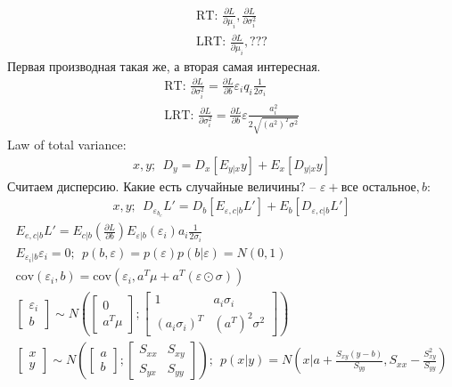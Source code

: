 \documentclass{minimal}
\begin{document}
\begin{gather*}
  \textrm{RT: }\frac{\partial L}{\partial \mu_i}, \frac{\partial L}{\partial \sigma^2_i}\\
  \textrm{LRT: }\frac{\partial L}{\partial \mu_i}, \textrm{???}
\end{gather*}
Первая производная такая же, а вторая самая интересная.
\begin{gather*}
  \textrm{RT: }\frac{\partial L}{\partial \sigma^2_i}=\frac{\partial L}{\partial b}\varepsilon_iq_i\frac{1}{2\sigma_i}\\
  \textrm{LRT: }\frac{\partial L}{\partial \sigma^2_i}=\frac{\partial L}{\partial b}\varepsilon\frac{a_i^2}{2\sqrt{(a^2)^{T}\sigma^2}}
\end{gather*}
Law of total variance:
\begin{gather*}
  x, y;~~ D_y=D_x\left[E_{y|x}y\right]+E_x\left[D_{y|x}y\right]
\end{gather*}
Считаем дисперсию. Какие есть случайные величины? -- $\varepsilon+\textrm{все остальное}, b$:
\begin{gather*}
  x, y;~~ D_{\varepsilon_{b_c}} L'=D_b\left[E_{\varepsilon,c|b}L'\right]+E_b\left[D_{\varepsilon,c|b}L'\right]
\end{gather*}
\begin{gather*}
  E_{e,c|b}L'=E_{c|b}\left(\frac{\partial L}{\partial b}\right)E_{\varepsilon|b}(\varepsilon_i)a_i\frac{1}{2\sigma_i}\\
E_{\varepsilon_i|b}\varepsilon_i=0;~~ p(b,\varepsilon)=p(\varepsilon)p(b|\varepsilon)=N(0,1)\\
  \mathrm{cov}(\varepsilon_i,b)=\mathrm{cov}(\varepsilon_i,a^T\mu+a^T(\varepsilon\odot\sigma))\\
\begin{bmatrix}
  \varepsilon_i\\ b
\end{bmatrix}\sim N\left(
  \begin{bmatrix}
    0\\a^{T}\mu
  \end{bmatrix};
  \begin{bmatrix}
    1&a_i\sigma_i\\
    (a_i\sigma_i)^T&\left(a^T\right)^2\sigma^2
  \end{bmatrix}\right)\\
  \begin{bmatrix}
    x\\y
  \end{bmatrix}\sim N\left(
  \begin{bmatrix}
    a\\b
  \end{bmatrix};
  \begin{bmatrix}
    S_{xx}&S_{xy}\\
    S_{yx}&S_{yy}
  \end{bmatrix}
\right);~~p(x|y)=N\left(x|
a+ \frac{S_{xy}(y-b)}{S_{yy}}, S_{xx}-\frac{S_{xy}^2}{S_{yy}}
\right)\\
\end{gather*}
\end{document}

